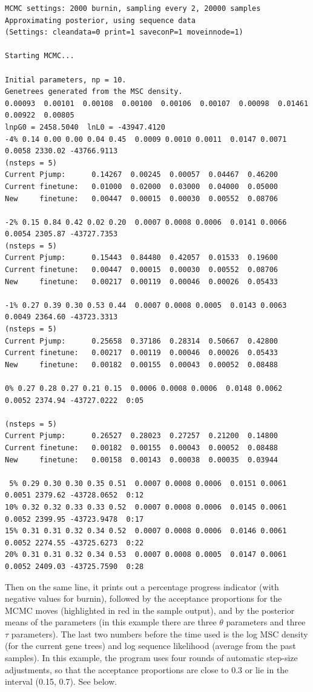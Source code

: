 \documentclass{book}
\numberwithin{equation}{section} \renewcommand{\baselinestretch}{0.55}
\begin{document}
\begin{verbatim}
MCMC settings: 2000 burnin, sampling every 2, 20000 samples
Approximating posterior, using sequence data
(Settings: cleandata=0 print=1 saveconP=1 moveinnode=1)

Starting MCMC...

Initial parameters, np = 10.
Genetrees generated from the MSC density.
0.00093  0.00101  0.00108  0.00100  0.00106  0.00107  0.00098  0.01461  0.00922  0.00805
lnpG0 = 2458.5040  lnL0 = -43947.4120
-4% 0.14 0.00 0.00 0.04 0.45  0.0009 0.0010 0.0011  0.0147 0.0071 0.0058 2330.02 -43766.9113
(nsteps = 5)
Current Pjump:      0.14267  0.00245  0.00057  0.04467  0.46200
Current finetune:   0.01000  0.02000  0.03000  0.04000  0.05000
New     finetune:   0.00447  0.00015  0.00030  0.00552  0.08706

-2% 0.15 0.84 0.42 0.02 0.20  0.0007 0.0008 0.0006  0.0141 0.0066 0.0054 2305.87 -43727.7353
(nsteps = 5)
Current Pjump:      0.15443  0.84480  0.42057  0.01533  0.19600
Current finetune:   0.00447  0.00015  0.00030  0.00552  0.08706
New     finetune:   0.00217  0.00119  0.00046  0.00026  0.05433

-1% 0.27 0.39 0.30 0.53 0.44  0.0007 0.0008 0.0005  0.0143 0.0063 0.0049 2364.60 -43723.3313
(nsteps = 5)
Current Pjump:      0.25658  0.37186  0.28314  0.50667  0.42800
Current finetune:   0.00217  0.00119  0.00046  0.00026  0.05433
New     finetune:   0.00182  0.00155  0.00043  0.00052  0.08488

0% 0.27 0.28 0.27 0.21 0.15  0.0006 0.0008 0.0006  0.0148 0.0062 0.0052 2374.94 -43727.0222  0:05

(nsteps = 5)
Current Pjump:      0.26527  0.28023  0.27257  0.21200  0.14800
Current finetune:   0.00182  0.00155  0.00043  0.00052  0.08488
New     finetune:   0.00158  0.00143  0.00038  0.00035  0.03944

 5% 0.29 0.30 0.30 0.35 0.51  0.0007 0.0008 0.0006  0.0151 0.0061 0.0051 2379.62 -43728.0652  0:12
10% 0.32 0.32 0.33 0.33 0.52  0.0007 0.0008 0.0006  0.0145 0.0061 0.0052 2399.95 -43723.9478  0:17
15% 0.31 0.31 0.32 0.34 0.52  0.0007 0.0008 0.0006  0.0146 0.0061 0.0052 2274.55 -43725.6273  0:22
20% 0.31 0.31 0.32 0.34 0.53  0.0007 0.0008 0.0005  0.0147 0.0061 0.0052 2409.03 -43725.7590  0:28
\end{verbatim}

Then on the same line, it prints out a percentage progress indicator
(with negative values for burnin), followed by the acceptance
proportions for the MCMC moves (highlighted in red in the sample
output), and by the posterior means of the parameters (in this example
there are three $\theta$ parameters and three $\tau$ parameters).  The
last two numbers before the time used is the log MSC density (for the
current gene trees) and log sequence likelihood (average from the past
samples).  In this example, the program uses four rounds of automatic
step-size adjustments, so that the acceptance proportions are close to
0.3 or lie in the interval (0.15, 0.7).  See below.
\end{document}
